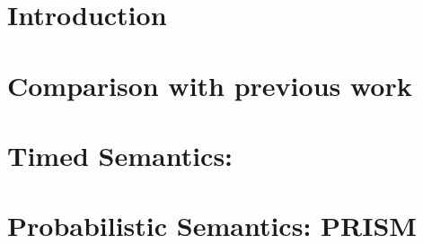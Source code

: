
\chapter{Introduction}\label{cha:semantics-intro}


\chapter{Comparison with previous work}\label{cha:semantics-comparison}


\chapter{Timed Semantics: \tockcsp}\label{cha:semantics-tockcsp}


\chapter{Probabilistic Semantics: PRISM}\label{cha:semantics-prism}
%

